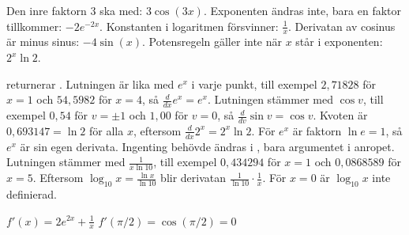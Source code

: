 \begin{facit}
  Den inre faktorn $3$ ska med: $3\cos(3x)$.
 Exponenten ändras inte, bara en faktor tillkommer: $-2e^{-2x}$.
 Konstanten i logaritmen försvinner: $\frac{1}{x}$.
 Derivatan av cosinus är minus sinus: $-4\sin(x)$.
 Potensregeln gäller inte när $x$ står i exponenten: $2^x \ln 2$.

   returnerar .
 Lutningen är lika med $e^x$ i varje punkt, till exempel $2{,}71828$ för $x = 1$ och
$54{,}5982$ för $x = 4$, så $\frac{d}{dx}e^x = e^x$.
 Lutningen stämmer med $\cos v$, till exempel $0{,}54$ för $v = \pm 1$ och $1{,}00$ för
$v = 0$, så $\frac{d}{dv}\sin v = \cos v$.
 Kvoten är $0{,}693147 = \ln 2$ för alla $x$, eftersom $\frac{d}{dx}2^x = 2^x \ln 2$. För
$e^x$ är faktorn $\ln e = 1$, så $e^x$ är sin egen derivata. Ingenting behövde ändras i
, bara argumentet i anropet.
 Lutningen stämmer med $\frac{1}{x \ln 10}$, till exempel $0{,}434294$ för $x = 1$ och
$0{,}0868589$ för $x = 5$. Eftersom $\log_{10} x = \frac{\ln x}{\ln 10}$ blir derivatan
$\frac{1}{\ln 10} \cdot \frac{1}{x}$. För $x = 0$ är $\log_{10} x$ inte definierad.

  $f'(x) = 2e^{2x} + \frac{1}{x}$
 $f'(\pi/2) = \cos(\pi/2) = 0$

\end{facit}
